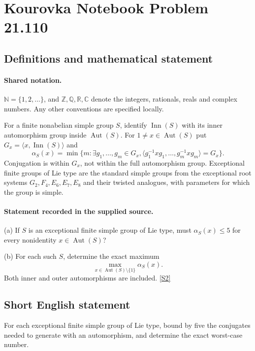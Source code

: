 \documentclass[11pt]{article}
\newcommand{\sref}[2]{\hyperlink{source:#1:#2}{[S#2]}}
\begin{document}
\section{Kourovka Notebook Problem 21.110}\label{statement}

\subsection{Definitions and mathematical statement}

\paragraph{Shared notation.}$\mathbb N=\{1,2,\ldots\}$, and $\mathbb Z,\mathbb Q,\mathbb R,\mathbb C$ denote the integers, rationals, reals and complex numbers. Any other conventions are specified locally.


For a finite nonabelian simple group $S$, identify $\operatorname{Inn}(S)$ with its inner automorphism group inside $\operatorname{Aut}(S)$. For $1\ne x\in\operatorname{Aut}(S)$ put $G_x=\langle x,\operatorname{Inn}(S)\rangle$ and
\[
 \alpha_S(x)=\min\{m:\exists g_1,\ldots,g_m\in G_x,
 \langle g_1^{-1}xg_1,\ldots,g_m^{-1}xg_m\rangle=G_x\}.
\]
Conjugation is within $G_x$, not within the full automorphism group. Exceptional finite groups of Lie type are the standard simple groups from the exceptional root systems $G_2,F_4,E_6,E_7,E_8$ and their twisted analogues, with parameters for which the group is simple.
\paragraph{Statement recorded in the supplied source.}
(a) If $S$ is an exceptional finite simple group of Lie type, must $\alpha_S(x)\leq5$ for every nonidentity $x\in\operatorname{Aut}(S)$?

(b) For each such $S$, determine the exact maximum
\[
 \max_{x\in\operatorname{Aut}(S)\setminus\{1\}}\alpha_S(x).
\]
Both inner and outer automorphisms are included. \sref{statement}{2}
\subsection{Short English statement}
For each exceptional finite simple group of Lie type, bound by five the conjugates needed to generate with an automorphism, and determine the exact worst-case number.
\end{document}
